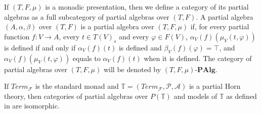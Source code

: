 \documentclass[reqno]{amsart}
\theoremstyle{definition}
\theoremstyle{remark}
\newcommand{\cat}[1]{\mathbf{#1}}
\newcommand{\PAlg}[1]{#1\text{-}\cat{PAlg}}
\numberwithin{figure}{section}
\begin{document}
If $(T,F,\mu)$ is a monadic presentation, then we define a category of its partial algebras as a full subcategory of partial algebras over $(T,F)$.
A partial algebra $(A,\alpha,\beta)$ over $(T,F)$ is a partial algebra over $(T,F,\mu)$ if, for every partial function $f : V \to A$,
    every $t \in T(V)_s$ and every $\varphi \in F(V)$, $\alpha_V(f)(\mu_V(t,\varphi))$ is defined if and only if $\alpha_V(f)(t)$ is defined and $\beta_V(f)(\varphi) = \top$,
    and $\alpha_V(f)(\mu_V(t,\varphi))$ equals to $\alpha_V(f)(t)$ when it is defined.
The category of partial algebras over $(T,F,\mu)$ will be denoted by $\PAlg{(T,F,\mu)}$.

\begin{lem}
If $Term_\mathcal{F}$ is the standard monad and $\mathbb{T} = (Term_\mathcal{F},\mathcal{P},\mathcal{A})$ is a partial Horn theory,
    then categories of partial algebras over $P(\mathbb{T})$ and models of $\mathbb{T}$ as defined in \cite{PHL} are isomorphic.
\end{lem}
\end{document}
